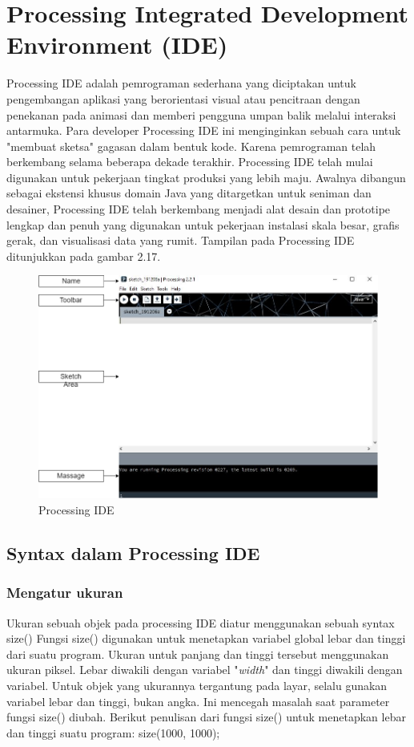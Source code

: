 \section{Processing Integrated Development Environment (IDE)}
Processing IDE adalah pemrograman sederhana yang diciptakan untuk pengembangan aplikasi yang berorientasi visual atau pencitraan dengan penekanan pada animasi dan memberi pengguna umpan balik melalui interaksi antarmuka. Para developer Processing IDE ini menginginkan sebuah cara untuk "membuat sketsa" gagasan dalam bentuk kode. Karena pemrograman telah berkembang selama beberapa dekade terakhir. Processing IDE telah mulai digunakan untuk pekerjaan tingkat produksi yang lebih maju. Awalnya dibangun sebagai ekstensi khusus domain Java yang ditargetkan untuk seniman dan desainer, Processing IDE telah berkembang menjadi alat desain dan prototipe lengkap dan penuh yang digunakan untuk pekerjaan instalasi skala besar, grafis gerak, dan visualisasi data yang rumit. Tampilan pada Processing IDE ditunjukkan pada gambar 2.17.
	\begin{figure}[H]
	\centering
	\includegraphics[width=12cm]{gambar/processing_view.png}
	\caption{Processing IDE}
	\end{figure}


\subsection{Syntax dalam Processing IDE }

\subsubsection{Mengatur ukuran}
Ukuran sebuah objek pada processing IDE diatur menggunakan sebuah syntax size() Fungsi size() digunakan untuk menetapkan variabel global lebar dan tinggi dari suatu program. Ukuran untuk panjang dan tinggi tersebut menggunakan ukuran piksel. Lebar diwakili dengan variabel "\textit{width}" dan tinggi diwakili dengan variabel. Untuk objek yang ukurannya tergantung pada layar, selalu gunakan variabel lebar dan tinggi, bukan angka. Ini mencegah masalah saat parameter fungsi size() diubah. Berikut penulisan dari fungsi size() untuk menetapkan lebar dan tinggi suatu program:  size(1000, 1000); 


